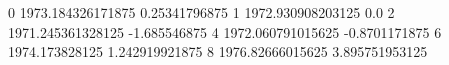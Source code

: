 0 1973.184326171875 0.25341796875
1 1972.930908203125 0.0
2 1971.245361328125 -1.685546875
4 1972.060791015625 -0.8701171875
6 1974.173828125 1.242919921875
8 1976.82666015625 3.895751953125
